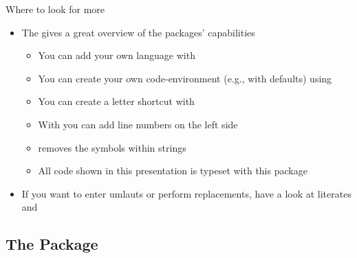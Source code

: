 \begin{frame}{Where to look for more}
   \begin{itemize}
      \itemsep8pt
      \item The  gives a great overview of the packages' capabilities \begin{itemize}
         \item You can add your own language with 
         \item You can create your own code-environment (e.g., with defaults) using 
         \item You can create a letter shortcut with 
         \item With  you can add line numbers on the left side
         \item {} removes the \T{\textvisiblespace} symbols within strings
         \item All code shown in this presentation is typeset with this package
      \end{itemize}
      \item If you want to enter umlauts or perform replacements, have a look at literates and 
   \end{itemize}
\end{frame}

\subsection{The  Package}
\begin{frame}

\end{frame}